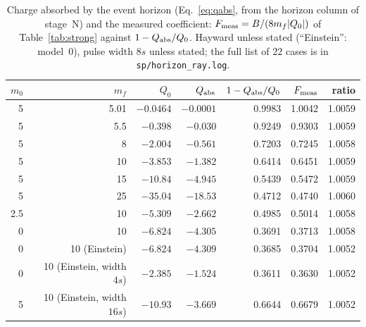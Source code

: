 \documentclass[11pt]{article}
\begin{document}
\begin{table}[ht]\centering\small
\begin{tabular}{rrrrrrr}
\hline
$m_0$ & $m_f$ & $Q_0$ & $Q_{\rm abs}$ & $1-Q_{\rm abs}/Q_0$ & $F_{\rm meas}$ & ratio\\
\hline
5 & 5.01 & $-0.0464$ & $-0.0001$ & 0.9983 & 1.0042 & 1.0059\\
5 & 5.5 & $-0.398$ & $-0.030$ & 0.9249 & 0.9303 & 1.0059\\
5 & 8 & $-2.004$ & $-0.561$ & 0.7203 & 0.7245 & 1.0058\\
5 & 10 & $-3.853$ & $-1.382$ & 0.6414 & 0.6451 & 1.0059\\
5 & 15 & $-10.84$ & $-4.945$ & 0.5439 & 0.5472 & 1.0059\\
5 & 25 & $-35.04$ & $-18.53$ & 0.4712 & 0.4740 & 1.0060\\
2.5 & 10 & $-5.309$ & $-2.662$ & 0.4985 & 0.5014 & 1.0058\\
0 & 10 & $-6.824$ & $-4.305$ & 0.3691 & 0.3713 & 1.0058\\
0 & 10 (Einstein) & $-6.824$ & $-4.309$ & 0.3685 & 0.3704 & 1.0052\\
0 & 10 (Einstein, width $4s$) & $-2.385$ & $-1.524$ & 0.3611 & 0.3630 & 1.0052\\
5 & 10 (Einstein, width $16s$) & $-10.93$ & $-3.669$ & 0.6644 & 0.6679 & 1.0052\\
\hline
\end{tabular}
\caption{Charge absorbed by the event horizon (Eq.~\eqref{eq:qabs}, from the horizon column of stage~N) and the measured coefficient: $F_{\rm meas}=B/(8m_f|Q_0|)$ of Table~\ref{tab:strong} against $1-Q_{\rm abs}/Q_0$. Hayward unless stated (``Einstein'': model~0), pulse width $8s$ unless stated; the full list of $22$ cases is in \texttt{sp/horizon\_ray.log}.}\label{tab:qabs}
\end{table}
\end{document}

